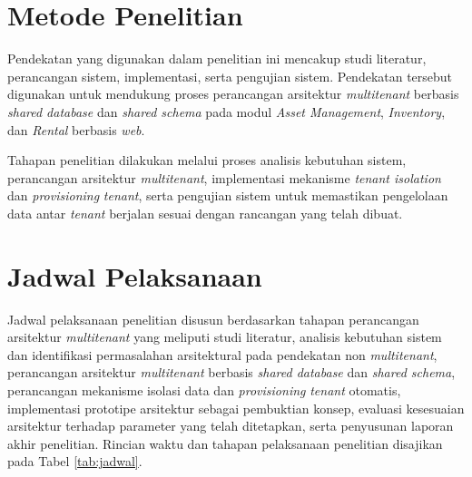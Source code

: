 \section{Metode Penelitian}

Pendekatan yang digunakan dalam penelitian ini mencakup studi literatur, perancangan sistem,
implementasi, serta pengujian sistem. Pendekatan tersebut digunakan untuk mendukung proses
perancangan arsitektur \textit{multitenant} berbasis \textit{shared database} dan \textit{shared schema}
pada modul \textit{Asset Management}, \textit{Inventory}, dan \textit{Rental} berbasis \textit{web}.

Tahapan penelitian dilakukan melalui proses analisis kebutuhan sistem, perancangan arsitektur
\textit{multitenant}, implementasi mekanisme \textit{tenant isolation} dan \textit{provisioning} \textit{tenant},
serta pengujian sistem untuk memastikan pengelolaan data antar \textit{tenant} berjalan sesuai dengan
rancangan yang telah dibuat.

\section{Jadwal Pelaksanaan}

Jadwal pelaksanaan penelitian disusun berdasarkan tahapan perancangan arsitektur \textit{multitenant} yang
meliputi studi literatur, analisis kebutuhan sistem dan identifikasi permasalahan arsitektural
pada pendekatan non \textit{multitenant}, perancangan arsitektur \textit{multitenant} berbasis \textit{shared
database} dan \textit{shared schema}, perancangan mekanisme isolasi data dan \textit{provisioning}
\textit{tenant} otomatis, implementasi prototipe arsitektur sebagai pembuktian konsep, evaluasi kesesuaian
arsitektur terhadap parameter yang telah ditetapkan, serta penyusunan laporan akhir penelitian.
Rincian waktu dan tahapan pelaksanaan penelitian disajikan pada Tabel \ref{tab:jadwal}.

